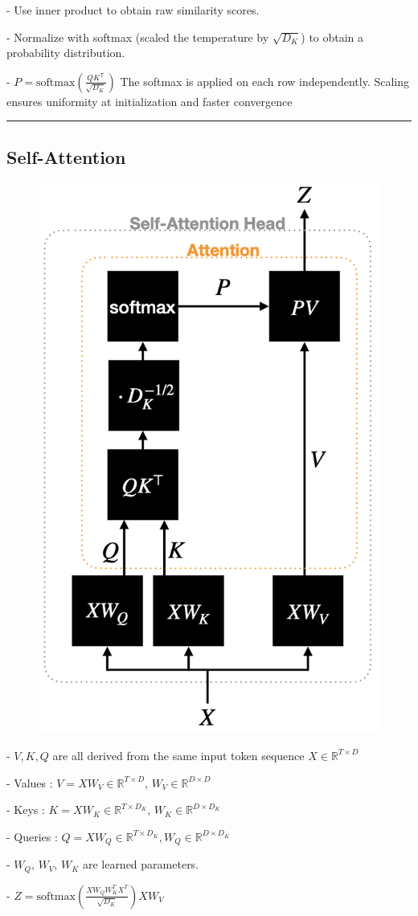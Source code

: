 - Use inner product to obtain raw similarity scores.

- Normalize with softmax (scaled the temperature by $\sqrt{D_{K}}$) to obtain a probability distribution.

- $P=\mathrm{softmax}\left({\frac{Q K^{\mathsf{T}}}{\sqrt{D_{K}}}}\right)$ The softmax is applied on each row independently. Scaling ensures uniformity
at initialization and faster convergence

\vspace{4pt}
\hrule
\vspace{4pt}
\subsection{Self-Attention}

\begin{figure}
  \includegraphics[width=0.4\columnwidth]{figures/self_attention.png}
\end{figure}

- $V,K,Q$ are all derived from the same input token
sequence $X\in\mathbb{R}^{T\times D}$

- Values : $V=X W_{V}\in\mathbb{R}^{T\times D},\,W_{V}\in\mathbb{R}^{D\times D}$

- Keys : $K=X W_{K}\in\mathbb{R}^{T\times D_{K}},\,W_{K}\in\mathbb{R}^{D\times D_{K}}$

- Queries : $Q=X W_{Q}\in\mathbb{R}^{T\times D_{K}},W_{Q}\in\mathbb{R}^{D\times D_{K}}$

- $W_{Q},\,W_{V},\,W_{K}$ are learned parameters.

- $Z=\mathrm{softmax}\left(\frac{X W_{Q}W_{K}^{T}X^{T}}{\sqrt{D_{K}}}\right)X W_{V}$

